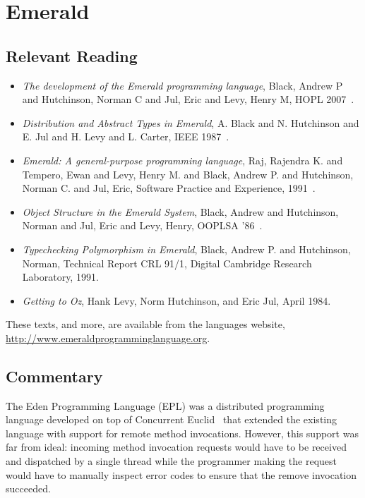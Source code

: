\section{Emerald}

\subsection{Relevant Reading}

\begin{itemize}
	\item \textit{The development of the Emerald programming language}, Black, Andrew P and Hutchinson, Norman C and Jul, Eric and Levy, Henry M, HOPL 2007~\cite{black2007development}.
	\item \textit{Distribution and Abstract Types in Emerald}, A. Black and N. Hutchinson and E. Jul and H. Levy and L. Carter, IEEE 1987~\cite{1702134}.
	\item \textit{Emerald: A general-purpose programming language}, Raj, Rajendra K. and Tempero, Ewan and Levy, Henry M. and Black, Andrew P. and Hutchinson, Norman C. and Jul, Eric, Software Practice and Experience, 1991~\cite{SPE:SPE4380210107}.
	\item \textit{Object Structure in the Emerald System}, Black, Andrew and Hutchinson, Norman and Jul, Eric and Levy, Henry, OOPLSA '86~\cite{Black:1986:OSE:28697.28706}.
	\item \textit{Typechecking Polymorphism in Emerald}, Black, Andrew P. and Hutchinson, Norman, Technical Report CRL 91/1, Digital Cambridge Research Laboratory, 1991.
	\item \textit{Getting to Oz}, Hank Levy, Norm Hutchinson, and Eric Jul, April 1984.
\end{itemize}

These texts, and more, are available from the languages website, \url{http://www.emeraldprogramminglanguage.org}.

\subsection{Commentary}

The Eden Programming Language (EPL) was a distributed programming language developed on top of Concurrent Euclid~\cite{holt1982short} that extended the existing language with support for remote method invocations.  However, this support was far from ideal: incoming method invocation requests would have to be received and dispatched by a single thread while the programmer making the request would have to manually inspect error codes to ensure that the remove invocation succeeded.

